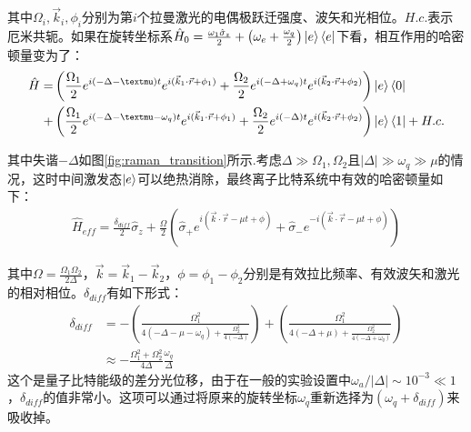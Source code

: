 其中$\Omega_i,\vec{k}_i, \phi_i$分别为第$i$个拉曼激光的电偶极跃迁强度、波矢和光相位。$H.c.$表示厄米共轭。如果在旋转坐标系$\hat{H}_0=\frac{\omega_1\hat{\sigma}_z}{2}+\left(\omega_e+\frac{\omega_q}{2}\right)\ket{e}\bra{e}$下看，相互作用的哈密顿量变为了：
\begin{align}
    \hat{H}=
    &\left(\frac{\Omega_1}{2}e^{i(-\Delta-\mu)t}e^{i(\vec{k}_1\cdot \vec{r}+\phi_1)}
    +\frac{\Omega_2}{2}e^{i(-\Delta+\omega_q)t}e^{i(\vec{k}_2\cdot \vec{r}+\phi_2)}\right)\ket{e}\bra{0}\\
    +&\left(\frac{\Omega_1}{2}e^{i(-\Delta-\mu-\omega_q)t}e^{i(\vec{k}_1\cdot \vec{r}+\phi_1)}
    +\frac{\Omega_2}{2}e^{i(-\Delta)t}e^{i(\vec{k}_2\cdot \vec{r}+\phi_2)}\right)\ket{e}\bra{1}+H.c.\label{eq:interaction_hamiltonian_yb}
\end{align}

其中失谐$-\Delta$如图\ref{fig:raman_transition}所示.考虑$\Delta\gg\Omega_1,\Omega_2$且$|\Delta|\gg\omega_q\gg\mu$的情况，这时中间激发态$\ket{e}$可以绝热消除，最终离子比特系统中有效的哈密顿量如下：
\begin{align}
    \hat{H}_{eff}=\frac{\delta_{diff}}{2}\hat{\sigma}_z+\frac{\Omega}{2}\left(\hat{\sigma}_+e^{i\left(\vec{k}\cdot\vec{r}-\mu t+\phi\right)}
    +\hat{\sigma}_-e^{-i\left(\vec{k}\cdot\vec{r}-\mu t+\phi\right)}\right)\label{eq:effective_hamiltonian_raman}
\end{align}

其中$\Omega=\frac{\Omega_1\Omega_2}{2\Delta}$，$\vec{k}=\vec{k}_1-\vec{k}_2$，$\phi=\phi_1-\phi_2$分别是有效拉比频率、有效波矢和激光的相对相位。$\delta_{diff}$有如下形式\cite[]{James_Jerke_2007}：
\begin{align}
    \delta_{diff}&=-\left(\frac{\Omega_1^2}{4(-\Delta-\mu-\omega_q)+\frac{\Omega_2^2}{4(-\Delta)}}\right)+\left(\frac{\Omega_1^2}{4(-\Delta+\mu)+\frac{\Omega_2^2}{4(-\Delta+\omega_q)}}\right)\\
    &\approx-\frac{\Omega_1^2+\Omega_2^2}{4\Delta}\frac{\omega_q}{\Delta}
\end{align}
这个是量子比特能级的差分光位移，由于在一般的实验设置中$\omega_a/|\Delta|\sim 10^{-3}\ll 1$，$\delta_{diff}$的值非常小。这项可以通过将原来的旋转坐标$\omega_q$重新选择为$(\omega_q+\delta_{diff})$来吸收掉。

